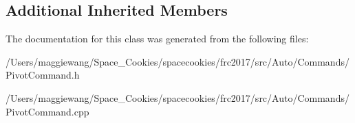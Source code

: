 \subsection*{Additional Inherited Members}


The documentation for this class was generated from the following files\+:\begin{DoxyCompactItemize}
\item 
/\+Users/maggiewang/\+Space\+\_\+\+Cookies/spacecookies/frc2017/src/\+Auto/\+Commands/Pivot\+Command.\+h\item 
/\+Users/maggiewang/\+Space\+\_\+\+Cookies/spacecookies/frc2017/src/\+Auto/\+Commands/Pivot\+Command.\+cpp\end{DoxyCompactItemize}
